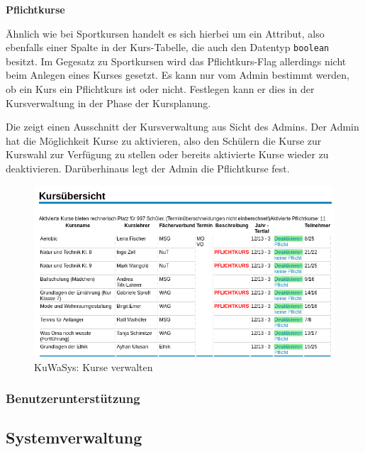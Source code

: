 \documentclass[12pt, twoside, a4paper, ngerman]{article}
\begin{document}
\textbf{Pflichtkurse}

Ähnlich wie bei Sportkursen handelt es sich hierbei um ein Attribut, also ebenfalls einer Spalte in der Kurs-Tabelle, die auch den Datentyp \texttt{boolean} besitzt.
Im Gegesatz zu Sportkursen wird das Pflichtkurs-Flag allerdings nicht beim Anlegen eines Kurses gesetzt. Es kann nur vom Admin bestimmt werden, ob ein Kurs ein Pflichtkurs ist oder nicht. Festlegen kann er dies in der Kursverwaltung in der Phase der Kursplanung.

Die  zeigt einen Ausschnitt der Kursverwaltung aus Sicht des Admins.
Der Admin hat die Möglichkeit Kurse zu aktivieren, also den Schülern die Kurse zur Kurswahl zur Verfügung zu stellen oder bereits aktivierte Kurse wieder zu deaktivieren.
Darüberhinaus legt der Admin die Pflichtkurse fest.

\begin{figure}[H]
 \begin{center}
   \includegraphics[scale=0.6]{img/KursVerwalten_KuWaSys.png}
 \end{center}
 \caption[\textbf{KuWaSys: Kurse verwalten}]{KuWaSys: Kurse verwalten}
 \label{fig:KursVerwalten_KuWaSys}
\end{figure}

\subsubsection{Benutzerunterstützung}


\subsection{Systemverwaltung}
\end{document}
